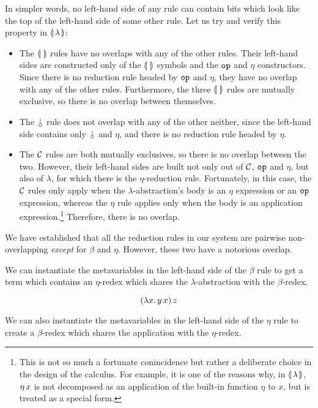 In simpler words, no left-hand side of any rule can contain bits which look
like the top of the left-hand side of some other rule. Let us try and
verify this property in $\llparenthesis \, \lambda \, \rrparenthesis$:
\begin{itemize}
\item The $\llparenthesis \,  \, \rrparenthesis$ rules have no overlaps with any of the other
  rules. Their left-hand sides are constructed only of the $\llparenthesis \,  \, \rrparenthesis$
  symbols and the $\mathtt{op}$ and $\eta$ constructors. Since there is no
  reduction rule headed by $\mathtt{op}$ and $\eta$, they have no overlap with
  any of the other rules. Furthermore, the three $\llparenthesis \,  \, \rrparenthesis$ rules are
  mutually exclusive, so there is no overlap between themselves.
\item The $\cherry$ rule does not overlap with any of the other neither,
  since the left-hand side contains only $\cherry$ and $\eta$, and there is
  no reduction rule headed by $\eta$.
\item The $\mathcal{C}$ rules are both mutually exclusives, so there is no overlap
  between the two. However, their left-hand sides are built not only out of
  $\mathcal{C}$, $\mathtt{op}$ and $\eta$, but also of $\lambda$, for which there is
  the $\eta$-reduction rule. Fortunately, in this case, the $\mathcal{C}$ rules
  only apply when the $\lambda$-abstraction's body is an $\eta$ expression
  or an $\mathtt{op}$ expression, whereas the $\eta$ rule applies only when the
  body is an application expression.\footnote{This is not so much a
    fortunate conincidence but rather a deliberate choice in the design of
    the calculus. For example, it is one of the reasons why, in ${\llparenthesis \, \lambda \, \rrparenthesis}$,
    $\eta\,x$ is not decomposed as an application of the built-in function
    $\eta$ to $x$, but is treated as a special form.} Therefore, there is
  no overlap.
\end{itemize}

We have established that all the reduction rules in our system are pairwise
non-overlapping \emph{except} for $\beta$ and $\eta$. However,
these two have a notorious overlap.

We can instantiate the metavariables in the left-hand side of the $\beta$
rule to get a term which contains an $\eta$-redex which shares the
$\lambda$-abstraction with the $\beta$-redex.

$$
(\lambda x.\, y\,x)\,z
$$

We can also instantiate the metavariables in the left-hand side of the
$\eta$ rule to create a $\beta$-redex which shares the application with
the $\eta$-redex.

